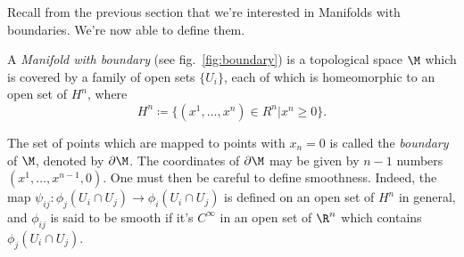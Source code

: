 Recall from the previous section that we're interested in Manifolds with boundaries. We're now able to define them.
\begin{definition}
    A \emph{Manifold with boundary} (see fig.~\ref{fig:boundary}) is a topological space $\M$ which is covered by a family of open sets $\{U_i\}$, each of which is homeomorphic to an open set of $H^n$, where
    \begin{equation}
        H^n \coloneq \{ (x^1, \dots, x^n) \in R^n | x^n \geq 0 \} .
    \end{equation} 
\end{definition}

The set of points which are mapped to points with $x_n = 0$ is called the \emph{boundary} of $\M$, denoted by $\partial \M$. The coordinates of $\partial \M$ may be given by $n-1$ numbers $(x^1, \dots, x^{n-1},0)$. One must then be careful to define smoothness. Indeed, the map $\psi_{ij} \colon \phi_j (U_i \cap U_j) \to \phi_i(U_i \cap U_j)$ is defined on an open set of $H^n$ in general, and $\phi_{ij}$ is said to be smooth if it's $C^\infty$ in an open set of $\R^n$ which contains $\phi_j(U_i \cap U_j)$.